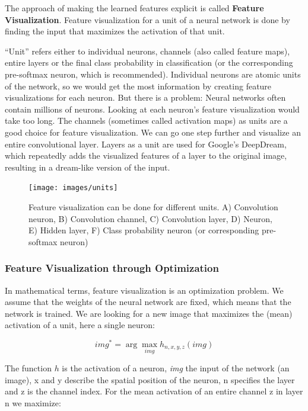 \documentclass[
  12pt,
]{krantz}
\begin{document}
The approach of making the learned features explicit is called \textbf{Feature Visualization}.
Feature visualization for a unit of a neural network is done by finding the input that maximizes the activation of that unit.

``Unit'' refers either to individual neurons, channels (also called feature maps), entire layers or the final class probability in classification (or the corresponding pre-softmax neuron, which is recommended).
Individual neurons are atomic units of the network, so we would get the most information by creating feature visualizations for each neuron.
But there is a problem:
Neural networks often contain millions of neurons.
Looking at each neuron's feature visualization would take too long.
The channels (sometimes called activation maps) as units are a good choice for feature visualization.
We can go one step further and visualize an entire convolutional layer.
Layers as a unit are used for Google's DeepDream, which repeatedly adds the visualized features of a layer to the original image, resulting in a dream-like version of the input.

\begin{figure}

{\centering \texttt{[image: images/units]} 

}

\caption{Feature visualization can be done for different units. A) Convolution neuron, B) Convolution channel, C) Convolution layer, D) Neuron, E) Hidden layer, F) Class probability neuron (or corresponding pre-softmax neuron)}\label{fig:units}
\end{figure}

\hypertarget{feature-visualization-through-optimization}{%
\subsubsection{Feature Visualization through Optimization}\label{feature-visualization-through-optimization}}

In mathematical terms, feature visualization is an optimization problem.
We assume that the weights of the neural network are fixed, which means that the network is trained.
We are looking for a new image that maximizes the (mean) activation of a unit, here a single neuron:

\[img^*=\arg\max_{img}h_{n,x,y,z}(img)\]

The function \(h\) is the activation of a neuron, \emph{img} the input of the network (an image), x and y describe the spatial position of the neuron, n specifies the layer and z is the channel index.
For the mean activation of an entire channel z in layer n we maximize:
\end{document}

